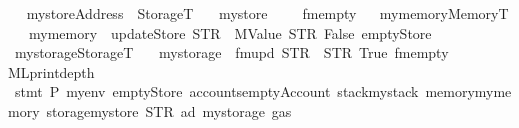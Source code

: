 \begin{isabellebody}
\ \isanewline
{}\isamarkupfalse%
\ mystore{\isacharcolon}{\kern0pt}{\isacharcolon}{\kern0pt}{\isachardoublequoteopen}Address\ {\isasymRightarrow}\ StorageT{\isachardoublequoteclose}\isanewline
\ \ \ {\isachardoublequoteopen}mystore\ {\isasymequiv}\ {\isasymlambda}\ {\isacharunderscore}{\kern0pt}\ {\isachardot}{\kern0pt}\ fmempty{\isachardoublequoteclose}\isanewline
\ \isanewline
{}\isamarkupfalse%
\ mymemory{\isacharcolon}{\kern0pt}{\isacharcolon}{\kern0pt}MemoryT\isanewline
\ \ \ {\isachardoublequoteopen}mymemory\ {\isasymequiv}\ updateStore\ {\isacharparenleft}{\kern0pt}STR\ {\isacharprime}{\kern0pt}{\isacharprime}{\kern0pt}{}{\isachardot}{\kern0pt}{}{\isacharprime}{\kern0pt}{\isacharprime}{\kern0pt}{\isacharparenright}{\kern0pt}\ {\isacharparenleft}{\kern0pt}MValue\ {\isacharparenleft}{\kern0pt}STR\ {\isacharprime}{\kern0pt}{\isacharprime}{\kern0pt}False{\isacharprime}{\kern0pt}{\isacharprime}{\kern0pt}{\isacharparenright}{\kern0pt}{\isacharparenright}{\kern0pt}\ emptyStore{\isachardoublequoteclose}\isanewline
\ \isanewline
{}\isamarkupfalse%
\ mystorage{\isacharcolon}{\kern0pt}{\isacharcolon}{\kern0pt}StorageT\isanewline
\ \ \ {\isachardoublequoteopen}mystorage\ {\isasymequiv}\ fmupd\ {\isacharparenleft}{\kern0pt}STR\ {\isacharprime}{\kern0pt}{\isacharprime}{\kern0pt}{}{\isachardot}{\kern0pt}{}{\isacharprime}{\kern0pt}{\isacharprime}{\kern0pt}{\isacharparenright}{\kern0pt}\ {\isacharparenleft}{\kern0pt}STR\ {\isacharprime}{\kern0pt}{\isacharprime}{\kern0pt}True{\isacharprime}{\kern0pt}{\isacharprime}{\kern0pt}{\isacharparenright}{\kern0pt}\ fmempty{\isachardoublequoteclose}\isanewline
\isanewline
{}\isamarkupfalse%
{\isacharbrackleft}{\kern0pt}{\isacharbrackleft}{\kern0pt}ML{\isacharunderscore}{\kern0pt}print{\isacharunderscore}{\kern0pt}depth\ {\isacharequal}{\kern0pt}\ {}{}{}{}{}{\isacharbrackright}{\kern0pt}{\isacharbrackright}{\kern0pt}\isanewline
{}\isamarkupfalse%
\ {\isacartoucheopen}{\isacharparenleft}{\kern0pt}stmt\ P{}\ myenv\ emptyStore\ {\isasymlparr}accounts{\isacharequal}{\kern0pt}emptyAccount{\isacharcomma}{\kern0pt}\ stack{\isacharequal}{\kern0pt}mystack{\isacharcomma}{\kern0pt}\ memory{\isacharequal}{\kern0pt}mymemory{\isacharcomma}{\kern0pt}\ storage{\isacharequal}{\kern0pt}{\isacharparenleft}{\kern0pt}mystore\ {\isacharparenleft}{\kern0pt}{\isacharparenleft}{\kern0pt}STR\ {\isacharprime}{\kern0pt}{\isacharprime}{\kern0pt}ad{\isacharprime}{\kern0pt}{\isacharprime}{\kern0pt}{\isacharparenright}{\kern0pt}{\isacharcolon}{\kern0pt}{\isacharequal}{\kern0pt}\ mystorage{\isacharparenright}{\kern0pt}{\isacharparenright}{\kern0pt}{\isacharcomma}{\kern0pt}\ gas{\isacharequal}{\kern0pt}{}{}{}{}{\isasymrparr}{\isacharparenright}{\kern0pt}{\isacartoucheclose}\ \ \isanewline

\end{isabellebody}

